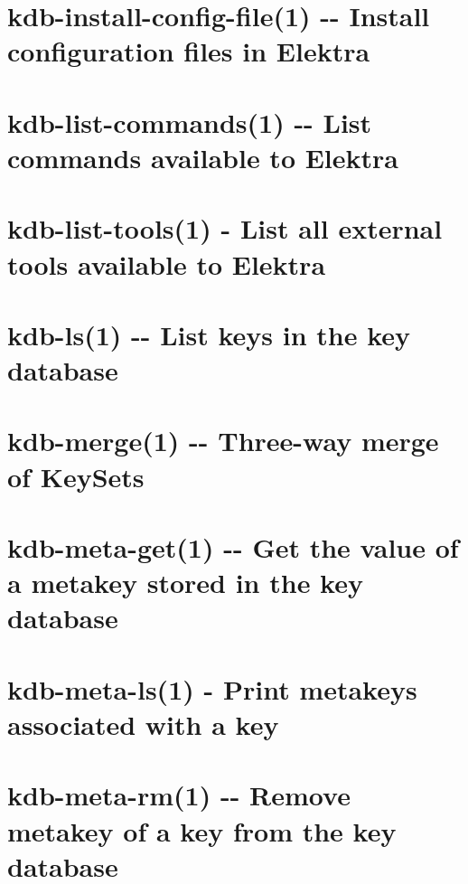 \documentclass[twoside]{book}
\newcommand{\+}{\discretionary{\mbox{\scriptsize$\hookleftarrow$}}{}{}}
\begin{document}
\chapter{kdb-\/install-\/config-\/file(1) -\/-\/ Install configuration files in Elektra}
\label{doc_help_kdb-install-config-file_md}

\chapter{kdb-\/list-\/commands(1) -\/-\/ List commands available to Elektra}
\label{doc_help_kdb-list-commands_md}

\chapter{kdb-\/list-\/tools(1) -\/ List all external tools available to Elektra}
\label{doc_help_kdb-list-tools_md}

\chapter{kdb-\/ls(1) -\/-\/ List keys in the key database}
\label{doc_help_kdb-ls_md}

\chapter{kdb-\/merge(1) -\/-\/ Three-\/way merge of Key\+Sets}
\label{doc_help_kdb-merge_md}

\chapter{kdb-\/meta-\/get(1) -\/-\/ Get the value of a metakey stored in the key database}
\label{doc_help_kdb-meta-get_md}

\chapter{kdb-\/meta-\/ls(1) -\/ Print metakeys associated with a key}
\label{doc_help_kdb-meta-ls_md}

\chapter{kdb-\/meta-\/rm(1) -\/-\/ Remove metakey of a key from the key database}
\label{doc_help_kdb-meta-rm_md}

\end{document}
